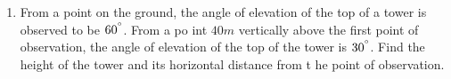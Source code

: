 \begin{enumerate}
\item From a point on the ground, the angle of elevation of
     the top of a tower is observed to be $60^{\degree}$. From a po    int $40 m$ vertically above the first point of observation, the     angle of elevation of the top of the tower is $30^{\degree}$.     Find the height of the tower and its horizontal distance from t    he point of observation.
\end{enumerate}
